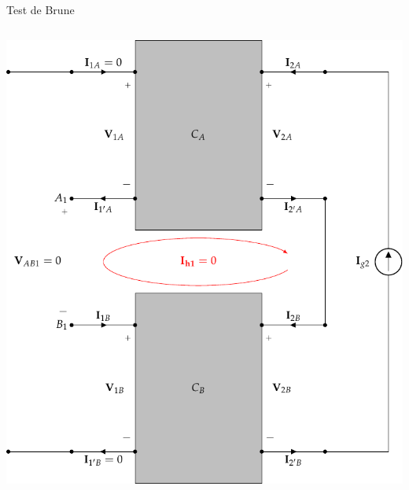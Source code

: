 \documentclass[xcolor={usenames,svgnames,dvipsnames}]{beamer}
\begin{document}
\begin{frame}[label={sec:orgabb371a},plain]{Test de Brune}
\begin{columns}
\begin{column}{0.65\columnwidth}
\begin{center}
\includegraphics[width=.9\linewidth]{../figs/serie-serie-brune-salida.pdf}
\end{center}
\end{column}
\end{columns}
\end{frame}
\end{document}
